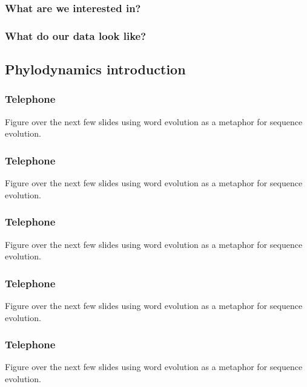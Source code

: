 \documentclass{beamer}
\begin{document}

\begin{frame}
\frametitle{What are we interested in?}
\end{frame}


\begin{frame}
\frametitle{What do our data look like?}
\end{frame}


\subsection{Phylodynamics introduction}

\begin{frame}
\frametitle{Telephone}
Figure over the next few slides using word evolution as a metaphor for sequence evolution.
\end{frame}


\begin{frame}
\frametitle{Telephone}
Figure over the next few slides using word evolution as a metaphor for sequence evolution.
\end{frame}


\begin{frame}
\frametitle{Telephone}
Figure over the next few slides using word evolution as a metaphor for sequence evolution.
\end{frame}


\begin{frame}
\frametitle{Telephone}
Figure over the next few slides using word evolution as a metaphor for sequence evolution.
\end{frame}


\begin{frame}
\frametitle{Telephone}
Figure over the next few slides using word evolution as a metaphor for sequence evolution.
\end{frame}

\end{document}
